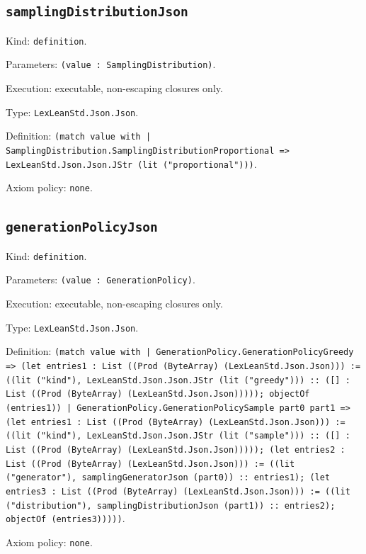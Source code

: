 \documentclass[11pt]{article}
\begin{document}
\subsection*{\texttt{samplingDistributionJson}}
\noindent Kind: \texttt{definition}.\par
\noindent Parameters: \texttt{(value : SamplingDistribution)}.\par
\noindent Execution: executable, non-escaping closures only.\par
\noindent Type: \texttt{LexLeanStd.Json.Json}.\par
\noindent Definition: \texttt{(match value with | SamplingDistribution.SamplingDistributionProportional => LexLeanStd.Json.Json.JStr (lit ("proportional")))}.\par
\noindent Axiom policy: \texttt{none}.\par
\subsection*{\texttt{generationPolicyJson}}
\noindent Kind: \texttt{definition}.\par
\noindent Parameters: \texttt{(value : GenerationPolicy)}.\par
\noindent Execution: executable, non-escaping closures only.\par
\noindent Type: \texttt{LexLeanStd.Json.Json}.\par
\noindent Definition: \texttt{(match value with | GenerationPolicy.GenerationPolicyGreedy => (let entries1 : List ((Prod (ByteArray) (LexLeanStd.Json.Json))) := ((lit ("kind"), LexLeanStd.Json.Json.JStr (lit ("greedy"))) :: ([] : List ((Prod (ByteArray) (LexLeanStd.Json.Json))))); objectOf (entries1)) | GenerationPolicy.GenerationPolicySample part0 part1 => (let entries1 : List ((Prod (ByteArray) (LexLeanStd.Json.Json))) := ((lit ("kind"), LexLeanStd.Json.Json.JStr (lit ("sample"))) :: ([] : List ((Prod (ByteArray) (LexLeanStd.Json.Json))))); (let entries2 : List ((Prod (ByteArray) (LexLeanStd.Json.Json))) := ((lit ("generator"), samplingGeneratorJson (part0)) :: entries1); (let entries3 : List ((Prod (ByteArray) (LexLeanStd.Json.Json))) := ((lit ("distribution"), samplingDistributionJson (part1)) :: entries2); objectOf (entries3)))))}.\par
\noindent Axiom policy: \texttt{none}.\par
\end{document}
